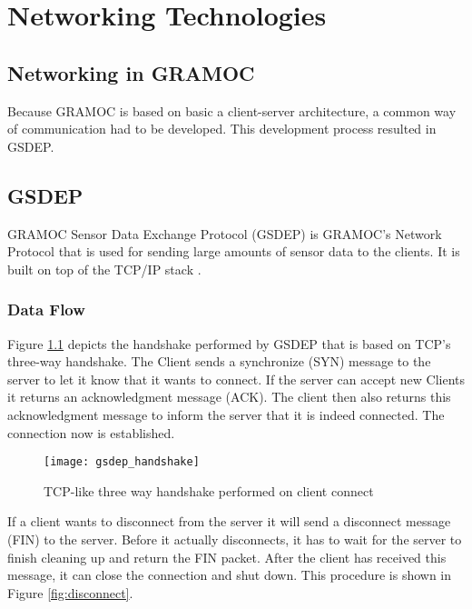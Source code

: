 \chapter{Networking Technologies}
\label{ch:networkingtechnologies}

\author{Nico Kratky}
%
\section{Networking in GRAMOC}

Because GRAMOC is based on basic a client-server architecture, a common way of communication had to be developed. This development process resulted in GSDEP.

\section{GSDEP}
\label{sec:GSDEP}

GRAMOC Sensor Data Exchange Protocol (GSDEP) is GRAMOC's Network Protocol that is used for sending large amounts of sensor data to the clients. It is built on top of the TCP/IP stack \cite{rfc793, rfc791}.

\subsection{Data Flow}
\label{sec:networking_data-flow}

Figure \ref{fig:handshake} depicts the handshake performed by GSDEP that is based on TCP's three-way handshake. The Client sends a synchronize (SYN) message to the server to let it know that it wants to connect. If the server can accept new Clients it returns an acknowledgment message (ACK). The client then also returns this acknowledgment message to inform the server that it is indeed connected. The connection now is established.

\begin{figure}[H]
    \centering
    \texttt{[image: gsdep\_handshake]}
    \caption{TCP-like three way handshake performed on client connect}
    \label{fig:handshake}
\end{figure}

If a client wants to disconnect from the server it will send a disconnect message (FIN) to the server. Before it actually disconnects, it has to wait for the server to finish cleaning up and return the FIN packet. After the client has received this message, it can close the connection and shut down. This procedure is shown in Figure \ref{fig:disconnect}.

